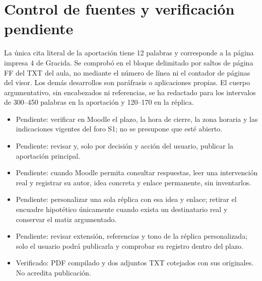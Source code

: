 \section{Control de fuentes y verificación pendiente}
La única cita literal de la aportación tiene 12 palabras y corresponde a la página impresa 4 de Gracida. Se comprobó en el bloque delimitado por saltos de página FF del TXT del aula, no mediante el número de línea ni el contador de páginas del visor. Los demás desarrollos son paráfrasis o aplicaciones propias. El cuerpo argumentativo, sin encabezados ni referencias, se ha redactado para los intervalos de 300--450 palabras en la aportación y 120--170 en la réplica.

\begin{itemize}
  \item Pendiente: verificar en Moodle el plazo, la hora de cierre, la zona horaria y las indicaciones vigentes del foro S1; no se presupone que esté abierto.
  \item Pendiente: revisar y, solo por decisión y acción del usuario, publicar la aportación principal.
  \item Pendiente: cuando Moodle permita consultar respuestas, leer una intervención real y registrar su autor, idea concreta y enlace permanente, sin inventarlos.
  \item Pendiente: personalizar una sola réplica con esa idea y enlace; retirar el encuadre hipotético únicamente cuando exista un destinatario real y conservar el matiz argumentado.
  \item Pendiente: revisar extensión, referencias y tono de la réplica personalizada; solo el usuario podrá publicarla y comprobar su registro dentro del plazo.
  \item Verificado: PDF compilado y dos adjuntos TXT cotejados con sus originales. No acredita publicación.
\end{itemize}

